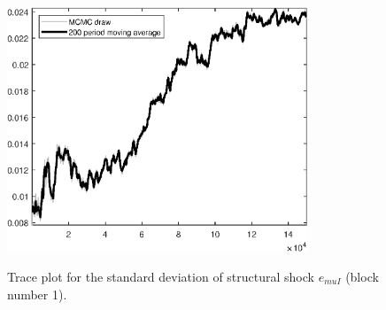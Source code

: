 \begin{figure}[H]
\centering
  \includegraphics[width=0.8\textwidth]{BRS_sectoral_wo_gmf/graphs/TracePlot_SE_e_muI_blck_1}\\
    \caption{Trace plot for the standard deviation of structural shock ${e_{muI}}$ (block number 1).}
\end{figure}
